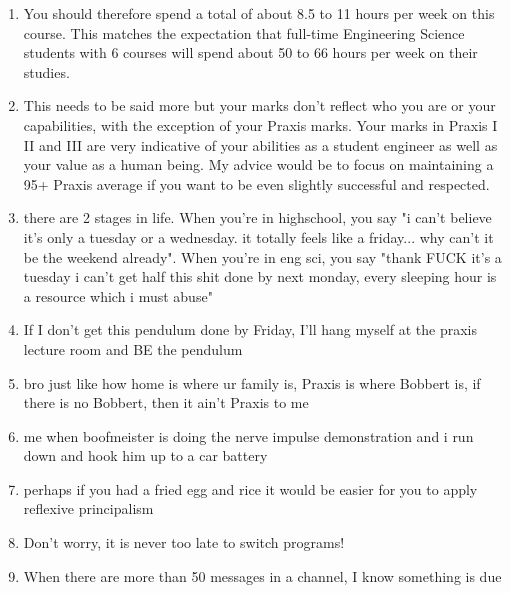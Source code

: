 \begin{enumerate}
    \item You should therefore spend a total of about 8.5 to 11 hours per week on this course. This matches the expectation that full-time Engineering Science students with 6 courses will spend about 50 to 66 hours per week on their studies.
    \item This needs to be said more but your marks don't reflect who you are or your capabilities, with the exception of your Praxis marks. Your marks in Praxis I II and III are very indicative of your abilities as a student engineer as well as your value as a human being. My advice would be to focus on maintaining a 95+ Praxis average if you want to be even slightly successful and respected.
    \item there are 2 stages in life. When you're in highschool, you say "i can't believe it's only a tuesday or a wednesday. it totally feels like a friday... why can't it be the weekend already". When you're in eng sci, you say "thank FUCK it's a tuesday i can't get half this shit done by next monday, every sleeping hour is a resource which i must abuse"
    \item If I don't get this pendulum done by Friday, I'll hang myself at the praxis lecture room and BE the pendulum
    \item bro just like how home is where ur family is, Praxis is where Bobbert is, if there is no Bobbert, then it ain't Praxis to me
    \item me when boofmeister is doing the nerve impulse demonstration and i run down and hook him up to a car battery
    \item perhaps if you had a fried egg and rice it would be easier for you to apply reflexive principalism
    \item Don't worry, it is never too late to switch programs!
    \item When there are more than 50 messages in a channel, I know something is due
\end{enumerate}
